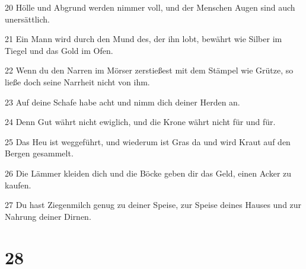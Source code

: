 \par 20 Hölle und Abgrund werden nimmer voll, und der Menschen Augen sind auch unersättlich.
\par 21 Ein Mann wird durch den Mund des, der ihn lobt, bewährt wie Silber im Tiegel und das Gold im Ofen.
\par 22 Wenn du den Narren im Mörser zerstießest mit dem Stämpel wie Grütze, so ließe doch seine Narrheit nicht von ihm.
\par 23 Auf deine Schafe habe acht und nimm dich deiner Herden an.
\par 24 Denn Gut währt nicht ewiglich, und die Krone währt nicht für und für.
\par 25 Das Heu ist weggeführt, und wiederum ist Gras da und wird Kraut auf den Bergen gesammelt.
\par 26 Die Lämmer kleiden dich und die Böcke geben dir das Geld, einen Acker zu kaufen.
\par 27 Du hast Ziegenmilch genug zu deiner Speise, zur Speise deines Hauses und zur Nahrung deiner Dirnen.

\chapter{28}

